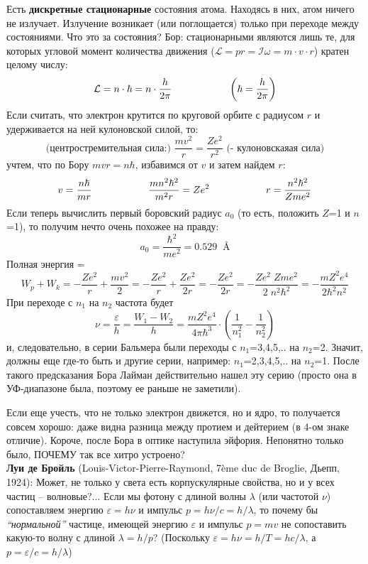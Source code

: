 Есть {\bf дискретные стационарные} состояния атома. Находясь в них, атом ничего не излучает. Излучение возникает (или поглощается) только при переходе между состояниями. Что это за состояния? Бор: стационарными являются лишь те, для которых угловой момент количества движения ($\mathcal{L}=pr=\mathcal{I}\omega=m\cdot v\cdot r$)
кратен целому числу:
\begin{displaymath}
\mathcal{L}=n\cdot\hbar=n\cdot\frac{h}{2\pi}\hspace{20mm}\left(\hbar=\frac{h}{2\pi}\right)
\end{displaymath}
Если считать, что электрон крутится по круговой орбите с радиусом $r$ и удерживается на ней кулоновской силой, то:
\begin{displaymath}
\texttt{(центростремительная сила:) }
\frac{mv^2}r =\frac{Ze^2}{r^2}
\texttt{ (- кулоновскаяая сила)}
\end{displaymath}
учтем, что по Бору $mvr=n\hbar$,  избавимся от $v$ и затем найдем $r$:
\begin{displaymath}
v=\frac{n\hbar}{mr}\hspace{20mm} \frac{mn^2\hbar^2}{m^2r} =Ze^2\hspace{20mm}r=\frac{n^2\hbar^2}{Zme^2}
\end{displaymath}
Если теперь вычислить первый боровский радиус $a_0$ (то есть, положить $Z$=1 и $n$=1), то получим нечто очень похожее на правду:
\begin{displaymath}
a_0=\frac{\hbar^2}{me^2}=0.529\;\;{\texttt{\AA}}
\end{displaymath}
Полная энергия =
\begin{displaymath}
W_p+W_k=-\frac{Ze^2}{r}+\frac{mv^2}2=-\frac{Ze^2}{r}+\frac{Ze^2}{2r}=-\frac{Ze^2}{2r}=
-\frac{Ze^2\;Zme^2}{2\;n^2\hbar^2}=-\frac{mZ^2e^4}{2\hbar^2n^2}
\end{displaymath}
При переходе с $n_1$ на $n_2$ частота будет
\begin{displaymath}
\nu=\frac{\varepsilon}{h}=\frac{W_1-W_2}{h}=\frac{mZ^2e^4}{4\pi\hbar^3}\cdot\left(\frac1{n_1^2}-\frac1{n_2^2}\right)
\end{displaymath}
и, следовательно, в серии Бальмера были переходы с $n_1$=3,4,5,.. на $n_2$=2. Значит, должны еще где-то быть и другие серии, например: $n_1$=2,3,4,5,.. на $n_2$=1.  После такого предсказания Бора Лайман действительно нашел эту серию (просто она в УФ-диапазоне была, поэтому ее раньше не заметили).

Если еще учесть, что не только электрон движется, но и ядро, то получается совсем хорошо: даже видна разница между протием и дейтерием (в 4-ом знаке отличие). Короче, после Бора в оптике наступила эйфория. Непонятно только было, ПОЧЕМУ так все хитро устроено? \\[5mm]
{\bf Луи де Бройль} (Louis-Victor-Pierre-Raymond, 7\`{e}me duc de Broglie, Дьепп, 1924):  Может, не только у света есть корпускулярные свойства, но и у всех частиц -- волновые?...  Если мы фотону с длиной волны $\lambda$ (или частотой $\nu$) сопоставляем энергию $\varepsilon=h\nu$ и импульс $p=h\nu/c=h/\lambda$, то почему бы {\em``нормальной''} частице, имеющей энергию $\varepsilon$ и импульс $p=mv$ не сопоставить какую-то волну с длиной $\lambda=h/p$? (Поскольку $\varepsilon=h\nu=h/T=hc/\lambda$, а $p=\varepsilon/c=h/\lambda$)


